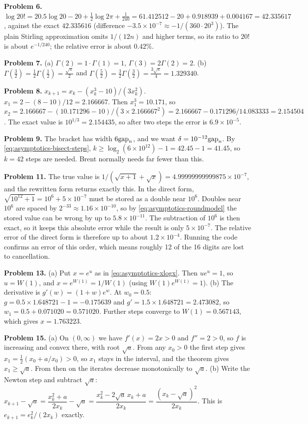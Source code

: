\textbf{Problem 6.} $\log20!=20.5\log20-20+\tfrac12\log2\pi+\tfrac1{240}=61.412512-20+0.918939+0.004167=42.335617$, against the exact $42.335616$ (difference $-3.5\times10^{-7}\approx-1/(360\cdot20^3)$). The plain Stirling approximation omits $1/(12n)$ and higher terms, so its ratio to $20!$ is about $e^{-1/240}$; the relative error is about $0.42\%$.

\textbf{Problem 7.} (a) $\Gamma(2)=1\cdot\Gamma(1)=1$, $\Gamma(3)=2\Gamma(2)=2$. (b) $\Gamma(\tfrac32)=\tfrac12\Gamma(\tfrac12)=\tfrac{\sqrt\pi}{2}$ and $\Gamma(\tfrac52)=\tfrac32\Gamma(\tfrac32)=\tfrac{3\sqrt\pi}{4}=1.329340$.

\textbf{Problem 8.} $x_{k+1}=x_k-(x_k^3-10)/(3x_k^2)$. $x_1=2-(8-10)/12=2.166667$. Then $x_1^3=10.171$, so $x_2=2.166667-(10.171296-10)/(3\times2.166667^2)=2.166667-0.171296/14.083333=2.154504$. The exact value is $10^{1/3}=2.154435$, so after two steps the error is $6.9\times10^{-5}$.

\textbf{Problem 9.} The bracket has width $6\mathrm{gap}_n$, and we want $\delta=10^{-12}\mathrm{gap}_n$. By \cref{eq:asymptotics-bisect-steps}, $k\ge\log_2(6\times10^{12})-1=42.45-1=41.45$, so $k=42$ steps are needed. Brent normally needs far fewer than this.

\textbf{Problem 11.} The true value is $1/(\sqrt{x+1}+\sqrt x)=4.99999999999875\times10^{-7}$, and the rewritten form returns exactly this. In the direct form, $\sqrt{10^{12}+1}=10^6+5\times10^{-7}$ must be stored as a double near $10^6$. Doubles near $10^6$ are spaced by $2^{-33}\approx1.16\times10^{-10}$, so by \cref{eq:asymptotics-roundmodel} the stored value can be wrong by up to $5.8\times10^{-11}$. The subtraction of $10^6$ is then exact, so it keeps this absolute error while the result is only $5\times10^{-7}$. The relative error of the direct form is therefore up to about $1.2\times10^{-4}$. Running the code confirms an error of this order, which means roughly 12 of the 16 digits are lost to cancellation.

\textbf{Problem 13.} (a) Put $x=e^u$ as in \cref{eq:asymptotics-xlogx}. Then $ue^u=1$, so $u=W(1)$, and $x=e^{W(1)}=1/W(1)$ (using $W(1)e^{W(1)}=1$). (b) The derivative is $g'(w)=(1+w)e^w$. At $w_0=0.5$: $g=0.5\times1.648721-1=-0.175639$ and $g'=1.5\times1.648721=2.473082$, so $w_1=0.5+0.071020=0.571020$. Further steps converge to $W(1)=0.567143$, which gives $x=1.763223$.

\textbf{Problem 15.} (a) On $(0,\infty)$ we have $f'(x)=2x>0$ and $f''=2>0$, so $f$ is increasing and convex there, with root $\sqrt a$. From any $x_0>0$ the first step gives $x_1=\tfrac12(x_0+a/x_0)>0$, so $x_1$ stays in the interval, and the theorem gives $x_1\ge\sqrt a$. From then on the iterates decrease monotonically to $\sqrt a$. (b) Write the Newton step and subtract $\sqrt a$: $x_{k+1}-\sqrt a=\dfrac{x_k^2+a}{2x_k}-\sqrt a=\dfrac{x_k^2-2\sqrt a\,x_k+a}{2x_k}=\dfrac{(x_k-\sqrt a)^2}{2x_k}$. This is $e_{k+1}=e_k^2/(2x_k)$ exactly.

